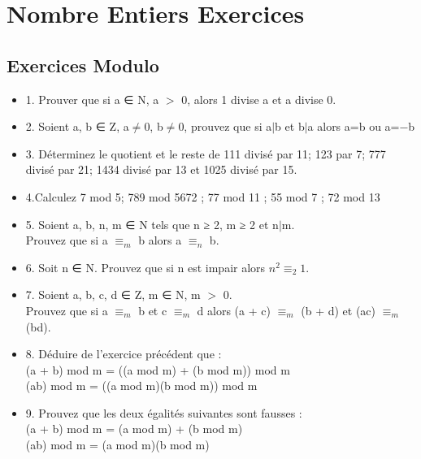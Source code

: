 \newpage

\chapter{Nombre Entiers Exercices}

\vspace{3mm} %
\section{Exercices Modulo}
\vspace{3mm} %

\begin{itemize}

\item {1. Prouver que si a ∈ N, a $>$ 0, alors 1 divise a et a divise 0. }

\item {2. Soient a, b ∈ Z, a$\neq$0, b$\neq$0, prouvez que si a$|$b et b$|$a alors a=b ou a=−b}

\item {3. Déterminez le quotient et le reste de 111 divisé par 11; 123 par 7; 777 divisé par 21; 1434 divisé par 13 et 1025 divisé par 15.}

\item {4.Calculez 7 mod 5; 789 mod 5672 ; 77 mod 11 ; 55 mod 7 ; 72 mod 13}

\item{5. Soient a, b, n, m ∈ N tels que n ≥ 2, m ≥ 2 et n$|$m. \\
 Prouvez que si a $≡_{m}$ b alors a $≡_{n}$ b.}

\item {6. Soit n ∈ N. Prouvez que si n est impair alors $n^{2} ≡_{2} 1$.}

\item {7. Soient a, b, c, d ∈ Z, m ∈ N, m $>$ 0. \\
    Prouvez que si a $≡_{m}$ b et c $≡_{m}$ d alors (a + c) $≡_{m}$ (b + d) et (ac) $≡_{m}$ (bd).}

\item {8. Déduire de l’exercice précédent que : \\
      (a + b) mod m = ((a mod m) + (b mod m)) mod m \\
      (ab) mod m = ((a mod m)(b mod m)) mod m }

\item {9. Prouvez que les deux égalités suivantes sont fausses : \\
      (a + b) mod m = (a mod m) + (b mod m) \\
      (ab) mod m = (a mod m)(b mod m)}
\end{itemize}


